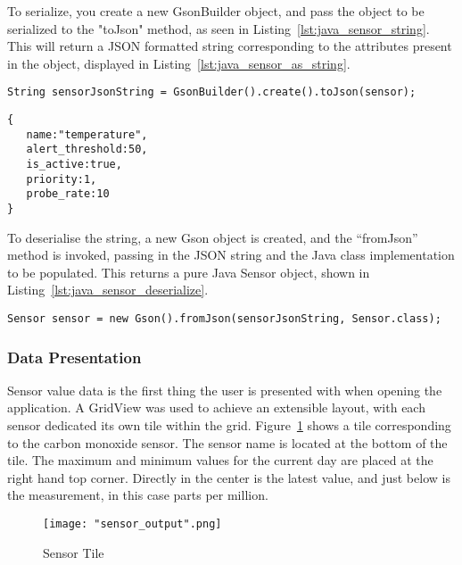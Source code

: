 \documentclass{article}
\begin{document}
\noindent
To serialize, you create a new GsonBuilder object, and pass the object to be serialized to the "toJson" method, as seen in Listing~\ref{lst:java_sensor_string}. This will return a JSON formatted string corresponding to the attributes present in the object, displayed in Listing~\ref{lst:java_sensor_as_string}.

\begin{lstlisting}[caption={Serialize object to string},label={lst:java_sensor_string}]
String sensorJsonString = GsonBuilder().create().toJson(sensor);
\end{lstlisting}

\begin{lstlisting}[caption={Sensor string resulting from serialization},label={lst:java_sensor_as_string}]
{  
   name:"temperature",
   alert_threshold:50,
   is_active:true,
   priority:1,
   probe_rate:10
}
\end{lstlisting}

\noindent
To deserialise the string, a new Gson object is created, and the “fromJson” method is invoked, passing in the JSON string and the Java class implementation to be populated. This returns a pure Java Sensor object, shown in Listing~\ref{lst:java_sensor_deserialize}.

\begin{lstlisting}[caption={Deserialize string to sensor object},label={lst:java_sensor_deserialize}]
Sensor sensor = new Gson().fromJson(sensorJsonString, Sensor.class);
\end{lstlisting}	

\subsubsection{Data Presentation}
Sensor value data is the first thing the user is presented with when opening the application. A GridView was used to achieve an extensible layout, with each sensor dedicated its own tile within the grid. Figure~\ref{fig:android_sensor_tile} shows a tile corresponding to the carbon monoxide sensor.  The sensor name is located at the bottom of the tile. The maximum and minimum values for the current day are placed at the right hand top corner. Directly in the center is the latest value, and just below is the measurement, in this case parts per million.
\begin{figure}[H]
\centering
\texttt{[image: "sensor\_output".png]}
\caption{Sensor Tile}
\label{fig:android_sensor_tile}
\end{figure}
\end{document}
